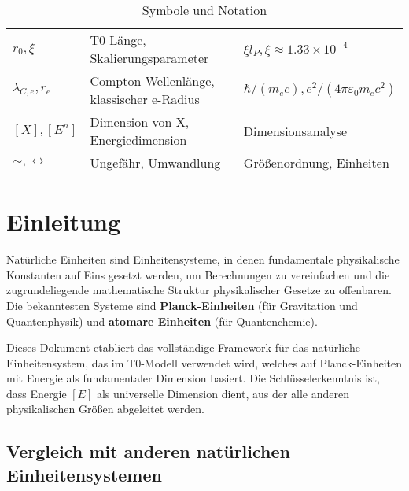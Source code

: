 \documentclass[11pt,a4paper]{article}
\begin{document}
{\begin{table}[htbp]
\begin{adjustbox}{width=0.98\textwidth}
\begin{tabular}{lll}
					$r_0, \xi$ & T0-Länge, Skalierungsparameter & $\xi l_P, \xi \approx 1.33 \times 10^{-4}$ \\
					$\lambda_{C,e}, r_e$ & Compton-Wellenlänge, klassischer e-Radius & $\hbar/(m_e c), e^2/(4\pi\varepsilon_0 m_e c^2)$ \\
					$[X], [E^n]$ & Dimension von X, Energiedimension & Dimensionsanalyse \\
					$\sim, \leftrightarrow$ & Ungefähr, Umwandlung & Größenordnung, Einheiten \\
					\bottomrule
				\end{tabular}
			\end{adjustbox}
			\caption{Symbole und Notation}
			\label{tab:symbole}
		\end{table}
	}
	
	\newpage
	
	\section{Einleitung}
	
	Natürliche Einheiten sind Einheitensysteme, in denen fundamentale physikalische Konstanten auf Eins gesetzt werden, um Berechnungen zu vereinfachen und die zugrundeliegende mathematische Struktur physikalischer Gesetze zu offenbaren. Die bekanntesten Systeme sind \textbf{Planck-Einheiten} (für Gravitation und Quantenphysik) und \textbf{atomare Einheiten} (für Quantenchemie).
	
	Dieses Dokument etabliert das vollständige Framework für das natürliche Einheitensystem, das im T0-Modell verwendet wird, welches auf Planck-Einheiten mit Energie als fundamentaler Dimension basiert. Die Schlüsselerkenntnis ist, dass Energie $[E]$ als universelle Dimension dient, aus der alle anderen physikalischen Größen abgeleitet werden.
	
	\subsection{Vergleich mit anderen natürlichen Einheitensystemen}
	
\end{document}
